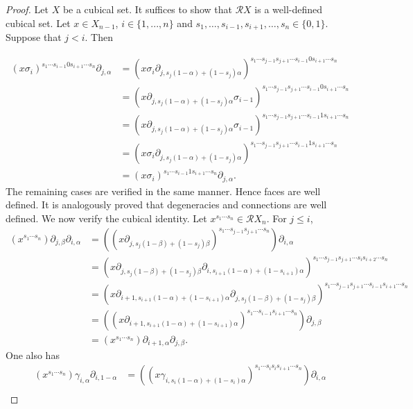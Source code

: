 \documentclass[oneside, 12pt]{amsart}
\numberwithin{equation}{section}
\theoremstyle{plain}
\theoremstyle{definition}
\theoremstyle{remark}
\begin{document}
	\begin{proof}
		Let $X$ be a cubical set. It suffices to show that $\mathcal{R}X$ is a well-defined cubical set. Let $x\in X_{n-1}$, $i\in\{1,...,n\}$ and $s_1,\ldots,s_{i-1},s_{i+1},\ldots,s_n\in\{0,1\}$. Suppose that $j<i$. Then
		
		\begin{align*}
			(x\sigma_i)^{s_1\cdots s_{i-1}0s_{i+1}\cdots s_n}\partial_{j,\alpha}&=(x\sigma_i\partial_{j,s_j(1-\alpha)+(1-s_j)\alpha})^{s_1\cdots s_{j-1}s_{j+1}\cdots s_{i-1}0s_{i+1}\cdots s_n}\\
			&=(x\partial_{j,s_j(1-\alpha)+(1-s_j)\alpha}\sigma_{i-1})^{s_1\cdots s_{j-1}s_{j+1}\cdots s_{i-1}0s_{i+1}\cdots s_n}\\
			&=(x\partial_{j,s_j(1-\alpha)+(1-s_j)\alpha}\sigma_{i-1})^{s_1\cdots s_{j-1}s_{j+1}\cdots s_{i-1}1s_{i+1}\cdots s_n}\\
			&=(x\sigma_{i}\partial_{j,s_j(1-\alpha)+(1-s_j)\alpha})^{s_1\cdots s_{j-1}s_{j+1}\cdots s_{i-1}1s_{i+1}\cdots s_n}\\
			&=(x\sigma_i)^{s_1\cdots s_{i-1}1s_{i+1}\cdots s_n}\partial_{j,\alpha}.
		\end{align*}
		The remaining cases are verified in the same manner. Hence faces are well defined. It is analogously proved that degeneracies and connections are well defined. We now verify the cubical identity. Let $x^{s_1\cdots s_n}\in\mathcal{R}X_n$. For $j\le i$,
		\begin{align*}
			(x^{s_1\cdots s_n})\partial_{j,\beta}\partial_{i,\alpha}&=((x\partial_{j,s_j(1-\beta)+(1-s_j)\beta})^{s_1\cdots s_{j-1}s_{j+1}\cdots s_n})\partial_{i,\alpha}\\
			&=(x\partial_{j,s_j(1-\beta)+(1-s_j)\beta}\partial_{i,s_{i+1}(1-\alpha)+(1-s_{i+1})\alpha})^{s_1\cdots s_{j-1}s_{j+1}\cdots s_{i}s_{i+2}\cdots s_n}\\
			&=(x\partial_{i+1,s_{i+1}(1-\alpha)+(1-s_{i+1})\alpha}\partial_{j,s_j(1-\beta)+(1-s_j)\beta})^{s_1\cdots s_{j-1}s_{j+1}\cdots s_{i-1}s_{i+1}\cdots s_n}\\
			&=((x\partial_{i+1,s_{i+1}(1-\alpha)+(1-s_{i+1})\alpha})^{s_1\cdots s_{i-1}s_{i+1}\cdots s_n})\partial_{j,\beta}\\
			&=(x^{s_1\cdots s_n})\partial_{i+1,\alpha}\partial_{j,\beta}.
		\end{align*}
		One also has
		\begin{align*}
			(x^{s_1\cdots s_n})\gamma_{i,\alpha}\partial_{i,1-\alpha}&=((x\gamma_{i,s_i(1-\alpha)+(1-s_i)\alpha})^{s_1\cdots s_is_is_{i+1}\cdots s_n})\partial_{i,\alpha}\\

\end{align*}
\end{proof}
\end{document}
